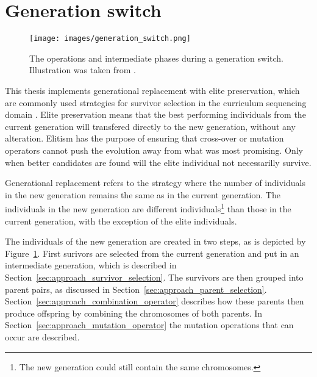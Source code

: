 \section{Generation switch}
\label{sec:approach_generation_switch}
\begin{figure}[ht!]
	\centering
	\texttt{[image: images/generation\_switch.png]}
	\caption[Generation switch]{The operations and intermediate phases during a generation switch. Illustration was taken from \cite{Whitley1994}.}
	\label{fig:generation_switch}
\end{figure}
This thesis implements generational replacement with elite preservation, which
are commonly used strategies for survivor selection in the curriculum
sequencing domain \cite{AlMuhaideb2011}.
Elite preservation means that the best performing individuals from the current
generation will transfered directly to the new generation, without any
alteration. Elitism has the purpose of ensuring that cross-over or mutation
operators cannot push the evolution away from what was most promising.
Only when better candidates are found will the elite individual not necessarilly survive.

Generational replacement refers to the strategy where the number of individuals
in the new generation remains the same as in the current generation. The
individuals in the new generation are different individuals\footnote{The new
generation  could still contain the same chromosomes.} than those in the
current generation, with the exception of the elite individuals.

The individuals of the new generation are created in two steps, as is depicted
by Figure~\ref{fig:generation_switch}. First surivors are selected from the
current generation and put in an intermediate generation, which is described in
Section~\ref{sec:approach_survivor_selection}. The survivors are then grouped
into parent pairs, as discussed in
Section~\ref{sec:approach_parent_selection}.
Section~\ref{sec:approach_combination_operator} describes how these parents
then produce offspring by combining the chromosomes of both parents. In
Section~\ref{sec:approach_mutation_operator} the mutation operations that
can occur are described.

